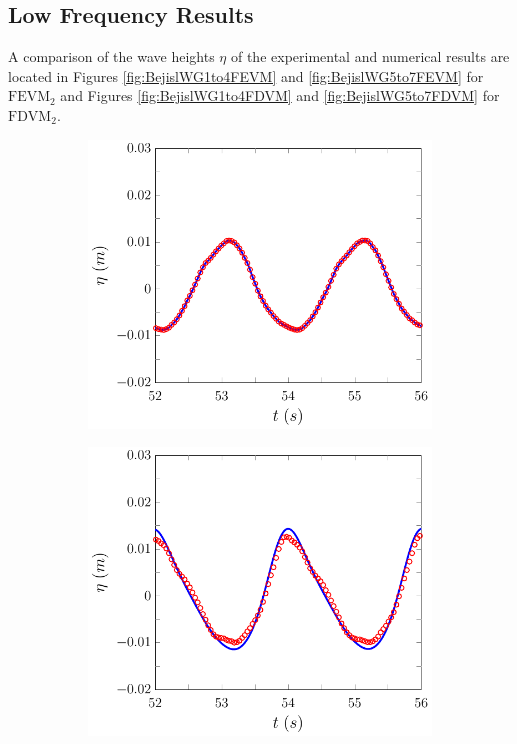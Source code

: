 \subsection{Low Frequency Results}
A comparison of the wave heights $\eta$ of the experimental and numerical results are located in Figures \ref{fig:BejislWG1to4FEVM} and \ref{fig:BejislWG5to7FEVM} for $\text{FEVM}_2$ and Figures \ref{fig:BejislWG1to4FDVM} and \ref{fig:BejislWG5to7FDVM} for $\text{FDVM}_2$.
\begin{figure}
	\centering
	\begin{subfigure}{0.5\textwidth}
		\includegraphics[width=\textwidth]{./chp6/figures/Experiment/Beji/sl/FEVMWG1.pdf}
		\vspace{0.5cm}
	\end{subfigure}%
	\begin{subfigure}{0.5\textwidth}
		\includegraphics[width=\textwidth]{./chp6/figures/Experiment/Beji/sl/FEVMWG2.pdf}

\end{subfigure}
\end{figure}
